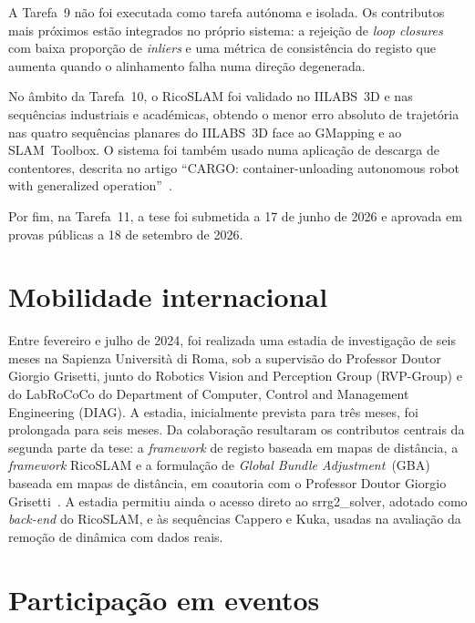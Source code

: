 \documentclass[11pt,a4paper,oneside]{article}
\begin{document}
A Tarefa~9 não foi executada como tarefa autónoma e isolada. Os contributos mais
próximos estão integrados no próprio sistema: a rejeição de
\textit{loop closures} com baixa proporção de \textit{inliers} e uma métrica de
consistência do registo que aumenta quando o alinhamento falha numa direção
degenerada.

No âmbito da Tarefa~10, o RicoSLAM foi validado no IILABS~3D e nas sequências
industriais e académicas, obtendo o menor erro absoluto de trajetória nas quatro
sequências planares do IILABS~3D face ao GMapping e ao SLAM~Toolbox. O sistema
foi também usado numa aplicação de descarga de contentores, descrita no artigo
\enquote{CARGO: container-unloading autonomous robot with generalized
operation}~\cite{lopes:icara:2026}.

Por fim, na Tarefa~11, a tese foi submetida a 17 de junho de 2026 e aprovada em
provas públicas a 18 de setembro de 2026.

\section{Mobilidade internacional}\label{sec:mobilidade}

Entre fevereiro e julho de 2024, foi realizada uma estadia de investigação de
seis meses na Sapienza Università di Roma, sob a supervisão do Professor Doutor
Giorgio Grisetti, junto do Robotics Vision and Perception Group (RVP-Group) e do
LabRoCoCo do Department of Computer, Control and Management Engineering (DIAG).
A estadia, inicialmente prevista para três meses, foi prolongada para seis
meses. Da colaboração resultaram os contributos centrais da segunda parte da
tese: a \textit{framework} de registo baseada em mapas de distância, a
\textit{framework} RicoSLAM e a formulação de \textit{Global Bundle
Adjustment}~(GBA) baseada em mapas de distância,
em coautoria com o Professor Doutor Giorgio Grisetti~\cite{sousa:robot:2026,
sousa:ral:2026}. A estadia permitiu ainda o acesso direto ao srrg2\_solver,
adotado como \textit{back-end} do RicoSLAM, e às sequências Cappero e Kuka,
usadas na avaliação da remoção de dinâmica com dados reais.

\section{Participação em eventos}\label{sec:eventos}
\end{document}
